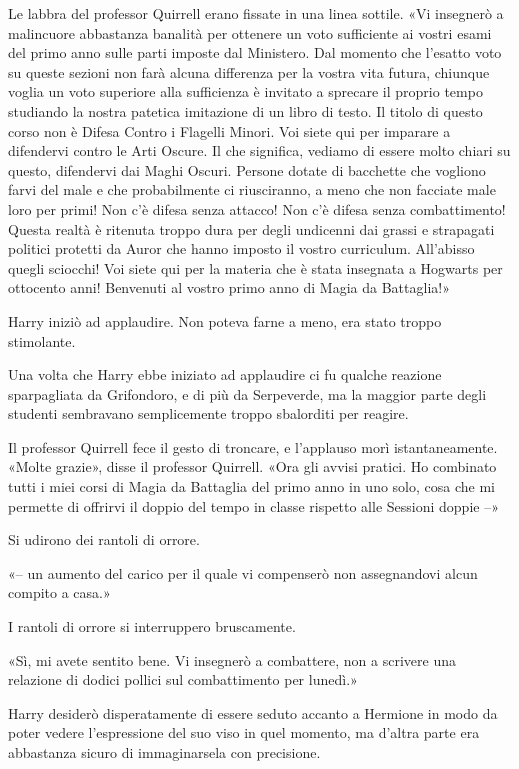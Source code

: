 Le labbra del professor Quirrell erano fissate in una linea sottile. «Vi insegnerò a malincuore abbastanza banalità per ottenere un voto sufficiente ai vostri esami del primo anno sulle parti imposte dal Ministero. Dal momento che l’esatto voto su queste sezioni non farà alcuna differenza per la vostra vita futura, chiunque voglia un voto superiore alla sufficienza è invitato a sprecare il proprio tempo studiando la nostra patetica imitazione di un libro di testo. Il titolo di questo corso non è Difesa Contro i Flagelli Minori. Voi siete qui per imparare a difendervi contro le Arti Oscure. Il che significa, vediamo di essere molto chiari su questo, difendervi dai Maghi Oscuri. Persone dotate di bacchette che vogliono farvi del male e che probabilmente ci riusciranno, a meno che non facciate male loro per primi! Non c’è difesa senza attacco! Non c’è difesa senza combattimento! Questa realtà è ritenuta troppo dura per degli undicenni dai grassi e strapagati politici protetti da Auror che hanno imposto il vostro curriculum. All’abisso quegli sciocchi! Voi siete qui per la materia che è stata insegnata a Hogwarts per ottocento anni! Benvenuti al vostro primo anno di Magia da Battaglia!»

Harry iniziò ad applaudire. Non poteva farne a meno, era stato troppo stimolante.

Una volta che Harry ebbe iniziato ad applaudire ci fu qualche reazione sparpagliata da Grifondoro, e di più da Serpeverde, ma la maggior parte degli studenti sembravano semplicemente troppo sbalorditi per reagire.

Il professor Quirrell fece il gesto di troncare, e l’applauso morì istantaneamente. «Molte grazie», disse il professor Quirrell. «Ora gli avvisi pratici. Ho combinato tutti i miei corsi di Magia da Battaglia del primo anno in uno solo, cosa che mi permette di offrirvi il doppio del tempo in classe rispetto alle Sessioni doppie –»

Si udirono dei rantoli di orrore.

«– un aumento del carico per il quale vi compenserò non assegnandovi alcun compito a casa.»

I rantoli di orrore si interruppero bruscamente.

«Sì, mi avete sentito bene. Vi insegnerò a combattere, non a scrivere una relazione di dodici pollici sul combattimento per lunedì.»

Harry desiderò disperatamente di essere seduto accanto a Hermione in modo da poter vedere l’espressione del suo viso in quel momento, ma d’altra parte era abbastanza sicuro di immaginarsela con precisione.

